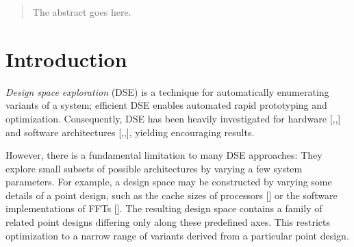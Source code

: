 \documentclass[conference]{IEEEtran}
\begin{document}
\begin{abstract}
The abstract goes here.
\end{abstract}





%
\IEEEpeerreviewmaketitle

\section{Introduction}
\textit{Design space exploration} (DSE) is a technique for automatically enumerating variants of a system; efficient DSE enables automated rapid prototyping and optimization. Consequently, DSE has been heavily investigated for hardware [,,] and software architectures [,,], yielding encouraging results. 

However, there is a fundamental limitation to many DSE approaches: They explore small subsets of possible architectures by varying a few system parameters. For example, a design space may be constructed by varying some details of a point design, such as the cache sizes of processors [] or the software implementations of FFTs []. The resulting design space contains a family of related point designs differing only along these predefined axes. This restricts optimization to a narrow range of variants derived from a particular point design. 
\end{document}
